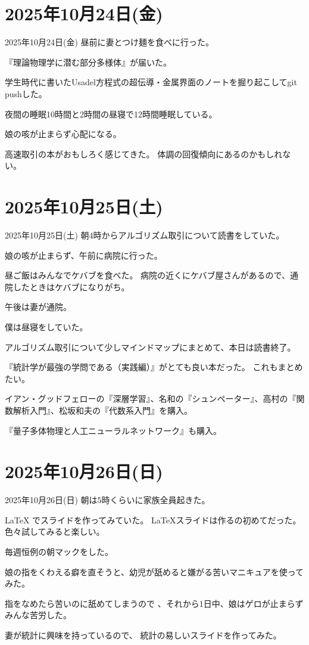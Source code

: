 \documentclass[dvipdfmx, autodetect-engine, aspectratio=169, 10.5pt]{beamer}
\begin{document}
\section{2025年10月24日(金)}

\begin{frame}{2025年10月24日(金)}
	昼前に妻とつけ麺を食べに行った。

	『理論物理学に潜む部分多様体』が届いた。

	学生時代に書いたUsadel方程式の超伝導・金属界面のノートを掘り起こしてgit pushした。

	夜間の睡眠10時間と2時間の昼寝で12時間睡眠している。

	娘の咳が止まらず心配になる。

	高速取引の本がおもしろく感じてきた。
	体調の回復傾向にあるのかもしれない。
\end{frame}

\section{2025年10月25日(土)}

\begin{frame}{2025年10月25日(土)}
	朝4時からアルゴリズム取引について読書をしていた。

	娘の咳が止まらず、午前に病院に行った。

	昼ご飯はみんなでケバブを食べた。
	病院の近くにケバブ屋さんがあるので、通院したときはケバブになりがち。

	午後は妻が通院。

	僕は昼寝をしていた。

	アルゴリズム取引について少しマインドマップにまとめて、本日は読書終了。

	『統計学が最強の学問である（実践編）』がとても良い本だった。
	これもまとめたい。

	イアン・グッドフェローの『深層学習』、名和の『シュンペーター』、高村の『関数解析入門』、松坂和夫の『代数系入門』を購入。

	『量子多体物理と人工ニューラルネットワーク』も購入。
\end{frame}

\section{2025年10月26日(日)}

\begin{frame}{2025年10月26日(日)}
	朝は5時くらいに家族全員起きた。

	LaTeX でスライドを作ってみていた。
	LaTeXスライドは作るの初めてだった。
	色々試してみると楽しい。

	毎週恒例の朝マックをした。

	娘の指をくわえる癖を直そうと、幼児が舐めると嫌がる苦いマニキュアを使ってみた。

	指をなめたら苦いのに舐めてしまうので 、それから1日中、娘はゲロが止まらずみんな苦労した。

	妻が統計に興味を持っているので、 統計の易しいスライドを作ってみた。
\end{frame}
\end{document}
